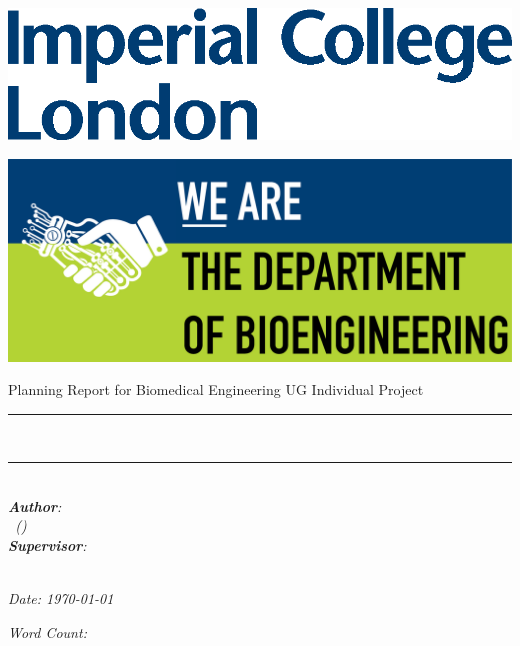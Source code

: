 \begin{titlepage}
\Large

\begin{minipage}{0.4\textwidth}
    \includegraphics[width=\textwidth]{figures/Imperial.eps}
\end{minipage}
\hfill
\begin{minipage}{0.4\textwidth}
\begin{flushright}
    \includegraphics[width=.9\textwidth]{figures/Bioeng.png}
\end{flushright}
\end{minipage}

\vspace{1.5cm}

\begin{center}
    {\huge Planning Report for Biomedical Engineering UG Individual Project} \\ [1cm]
    \rule{\textwidth}{.1cm} \\[0.4cm]
    {\Huge \reporttitle}
    \rule{\textwidth}{.1cm} \\ [1.5cm]

    \textit{\textbf{Author}: \\ \reportauthor \ (\cid)} \\ [1cm]
    \textit{\textbf{Supervisor}: \\ \reportsupervisor} \\ [1cm]

    \vfill
    
    \begin{minipage}{0.5\textwidth}
    \centering
        \textit{Date: \today} \\ [1cm]
    \end{minipage}
    \hfill
    \begin{minipage}{0.4\textwidth}
    \centering
        \textit{Word Count: \wordcount} \\ [1cm]
    \end{minipage}
\end{center}

\end{titlepage}